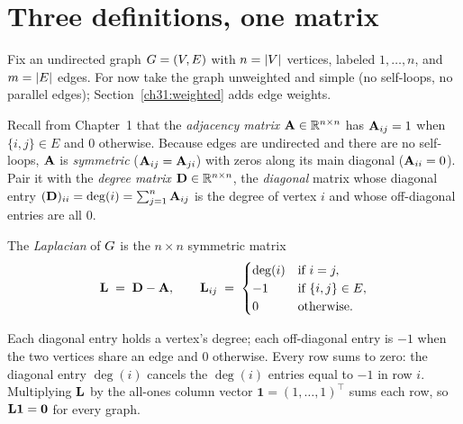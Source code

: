 \chapterline

\section{Three definitions, one matrix}

Fix an undirected graph $G=(V,E)$ with $n=\lvert V\rvert$ vertices, labeled $1,\dots,n$, and $m=\lvert E\rvert$ edges. For now take the graph unweighted and simple (no self-loops, no parallel edges); Section~\ref{ch31:weighted} adds edge weights.

Recall from Chapter~1 that the \emph{adjacency matrix} $\mathbf{A} \in \mathbb{R}^{n\times n}$ has $\mathbf{A}_{ij}=1$ when $\{i,j\}\in E$ and $0$ otherwise. Because edges are undirected and there are no self-loops, $\mathbf{A}$ is \emph{symmetric} ($\mathbf{A}_{ij} = \mathbf{A}_{ji}$) with zeros along its main diagonal ($\mathbf{A}_{ii}=0$). Pair it with the \emph{degree matrix} $\mathbf{D} \in \mathbb{R}^{n\times n}$, the \emph{diagonal} matrix whose diagonal entry $(\mathbf{D})_{ii} = \deg(i) = \sum_{j=1}^n \mathbf{A}_{ij}$ is the degree of vertex $i$ and whose off-diagonal entries are all $0$.

\begin{definition}\label{ch31:def-laplacian}
The \emph{Laplacian} of $G$ is the $n\times n$ symmetric matrix
\[
  \mathbf{L} \;=\; \mathbf{D} - \mathbf{A},
  \qquad
  \mathbf{L}_{ij} \;=\;
  \begin{cases}
    \deg(i) & \text{if } i = j,\\
    -1 & \text{if } \{i,j\}\in E,\\
    0 & \text{otherwise.}
  \end{cases}
\]
\end{definition}

Each diagonal entry holds a vertex's degree; each off-diagonal entry is $-1$ when the two vertices share an edge and $0$ otherwise. Every row sums to zero: the diagonal entry $\deg(i)$ cancels the $\deg(i)$ entries equal to $-1$ in row $i$. Multiplying $\mathbf{L}$ by the all-ones column vector $\mathbf{1} = (1,\dots,1)^\top$ sums each row, so $\mathbf{L} \mathbf{1} = \mathbf{0}$ for every graph.

